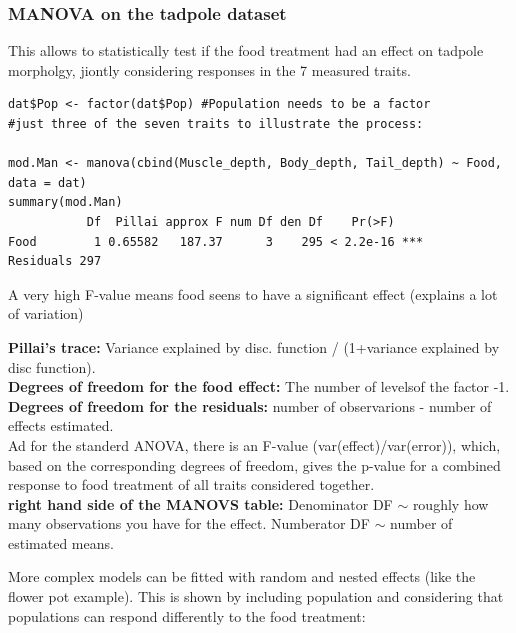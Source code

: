 \documentclass{article}
\begin{document}
\subsubsection{MANOVA on the tadpole dataset}
This allows to statistically test if the food treatment had an effect on tadpole morpholgy, jiontly considering responses in the 7 measured traits. 

\begin{lstlisting}
dat$Pop <- factor(dat$Pop) #Population needs to be a factor 
#just three of the seven traits to illustrate the process:

mod.Man <- manova(cbind(Muscle_depth, Body_depth, Tail_depth) ~ Food, data = dat)
summary(mod.Man)
           Df  Pillai approx F num Df den Df    Pr(>F)    
Food        1 0.65582   187.37      3    295 < 2.2e-16 ***
Residuals 297                                             
\end{lstlisting}

A very high F-value means food seens to have a significant effect (explains a lot of variation)

\textbf{Pillai's trace:} Variance explained by disc. function / (1+variance explained by disc function). \\ 
\textbf{Degrees of freedom for the food effect:} The number of levelsof the factor -1.\\
\textbf{Degrees of freedom for the residuals:} number of observarions - number of effects estimated. \\
Ad for the standerd ANOVA, there is an F-value (var(effect)/var(error)), which, based on the corresponding degrees of freedom, gives the p-value for a combined response to food treatment of all traits considered together.\\
\textbf{right hand side of the MANOVS table:} Denominator DF $\sim$ roughly how many observations you have for the effect. Numberator DF $\sim$ number of estimated means.\par 
More complex models can be fitted with random and nested effects (like the flower pot example). This is shown by including population and considering that populations can respond differently to the food treatment:
\end{document}
